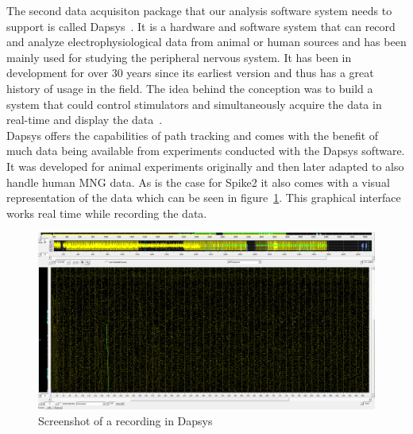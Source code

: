 The second data acquisiton package that our analysis software system needs to support is called Dapsys~\cite{dapsys}. It is a hardware and software system that can record and analyze electrophysiological data from animal or human sources and has been mainly used for studying the peripheral nervous system. It has been in development for over 30 years since its earliest version and thus has a great history of usage in the field. The idea behind the conception was to build a system that could control stimulators and simultaneously acquire the data in real-time and display the data~\cite{dapsysArticle}.\\
Dapsys offers the capabilities of path tracking and comes with the benefit of much data being available from experiments conducted with the Dapsys software. It was developed for animal experiments originally and then later adapted to also handle human MNG data. As is the case for Spike2 it also comes with a visual representation of the data which can be seen in figure~\ref{fig:dapsys}. This graphical interface works real time while recording the data.\\
\begin{figure}
	\includegraphics[width = \textwidth]{src/pic/Dapsys_sc}
	\caption{Screenshot of a recording in Dapsys}
	\label{fig:dapsys}
\end{figure}



